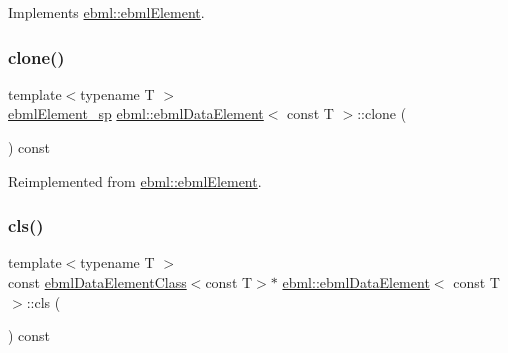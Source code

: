 Implements \mbox{\hyperlink{classebml_1_1ebmlElement_a27bd9de14e1706840235b68331917776}{ebml\+::ebml\+Element}}.

\mbox{\label{classebml_1_1ebmlDataElement_3_01const_01T_01_4_a23f7032682dfdf20ce042caf144e50d6}} 
\subsubsection{\texorpdfstring{clone()}{clone()}}
{\footnotesize\ttfamily template$<$typename T $>$ \\
\mbox{\hyperlink{namespaceebml_adad533b7705a16bb360fe56380c5e7be}{ebml\+Element\+\_\+sp}} \mbox{\hyperlink{classebml_1_1ebmlDataElement}{ebml\+::ebml\+Data\+Element}}$<$ const T $>$\+::clone (\begin{DoxyParamCaption}{ }\end{DoxyParamCaption}) const\hspace{0.3cm}{\ttfamily [virtual]}}



Reimplemented from \mbox{\hyperlink{classebml_1_1ebmlElement_a94013f01b6f12c9c66864d44983dce47}{ebml\+::ebml\+Element}}.

\mbox{\label{classebml_1_1ebmlDataElement_3_01const_01T_01_4_a27173a9d7784ce0cfca71e1c72c36ec7}} 
\subsubsection{\texorpdfstring{cls()}{cls()}}
{\footnotesize\ttfamily template$<$typename T $>$ \\
const \mbox{\hyperlink{classebml_1_1ebmlDataElementClass}{ebml\+Data\+Element\+Class}}$<$const T$>$$\ast$ \mbox{\hyperlink{classebml_1_1ebmlDataElement}{ebml\+::ebml\+Data\+Element}}$<$ const T $>$\+::cls (\begin{DoxyParamCaption}{ }\end{DoxyParamCaption}) const\hspace{0.3cm}{\ttfamily [virtual]}}



